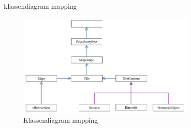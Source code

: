 \documentclass[eind]{penoverslag}
\begin{document}
 klassendiagram mapping
\begin{figure}[h]
\centering
	\includegraphics[width=0.8\textwidth]{klasMapping}
\caption{Klassendiagram mapping}
\label{fig:klasMap}
\end{figure}

%
%
%
\end{document}
